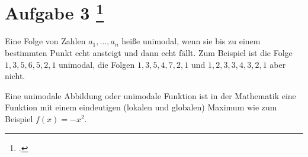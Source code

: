 \documentclass{bschlangaul-aufgabe}
\begin{document}
\section{Aufgabe 3
\footcite{examen:46115:2015:09}}

Eine Folge von Zahlen $a_1, \dots, a_n$ heiße unimodal, wenn sie bis zu
einem bestimmten Punkt echt ansteigt und dann echt fällt. Zum Beispiel
ist die Folge $1,3,5,6,5,2,1$ unimodal, die Folgen $1,3,5,4,7,2,1$ und
$1,2,3,3,4,3,2,1$ aber nicht.

\begin{bExkurs}
Eine unimodale Abbildung oder unimodale Funktion ist in der Mathematik
eine Funktion mit einem eindeutigen (lokalen und globalen) Maximum wie
zum Beispiel $f(x)=-x^{2}$.
\end{bExkurs}
\end{document}
